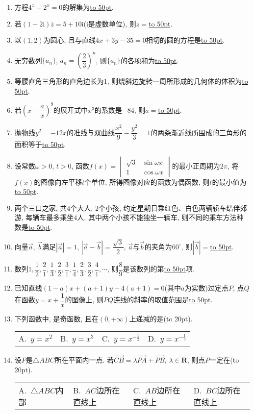 \documentclass[10pt,a4paper]{article}
\newcommand{\blank}[1]{\underline{\hbox to #1pt{}}}
\newcommand{\bracket}[1]{(\hbox to #1pt{})}
\newcommand{\fourch}[4]{\par\begin{tabular}{p{.23\textwidth}p{.23\textwidth}p{.23\textwidth}p{.23\textwidth}}
A.~#1 &B.~#2& C.~#3& D.~#4
\end{tabular}}
\begin{document}
\begin{enumerate}[1.]

\item 方程$4^x-2^x=0$的解集为\blank{50}.
\item 若$(1-2\mathrm{i})\overline z=5+10\mathrm{i}$($\mathrm{i}$是虚数单位), 则$z=$\blank{50}.
\item 以$(1,2)$为圆心, 且与直线$4x+3y-35=0$相切的圆的方程是\blank{50}.
\item 无穷数列$\{a_n\}$, $a_n=(\dfrac 23)^n$, 则$\{a_n\}$的各项和为\blank{50}.
\item 等腰直角三角形的直角边长为$1$, 则绕斜边旋转一周所形成的几何体的体积为\blank{50}.
\item 若$(x-\dfrac ax)^9$的展开式中$x^3$的系数是$-84$, 则$a=$\blank{50}.
\item 抛物线$y^2=-12x$的准线与双曲线$\dfrac{x^2}9-\dfrac{y^2}3=1$的两条渐近线所围成的三角形的面积等于\blank{50}.
\item 设常数$\omega >0$, $t>0$, 函数$f(x)=\begin{vmatrix}
\sqrt 3 & \sin \omega x  \\ 1 & \cos \omega x  \end{vmatrix}$的最小正周期为$2\pi$, 将$f(x)$的图像向左平移$t$个单位, 所得图像对应的函数为偶函数, 则$t$的最小值为\blank{50}.
\item 两个三口之家, 共$4$个大人, $2$个小孩, 约定星期日乘红色、白色两辆轿车结伴郊游, 每辆车最多乘坐$4$人, 其中两个小孩不能独坐一辆车, 则不同的乘车方法种数是\blank{50}.
\item 向量$\overrightarrow  a$, $\overrightarrow  b$满足$|\overrightarrow  a|=1$, $|\overrightarrow  a-\overrightarrow  b|=\dfrac{\sqrt 3}2$, $\overrightarrow  a$与$\overrightarrow  b$的夹角为$60^\circ$, 则$|\overrightarrow  b|=$\blank{50}.
\item 数列$1,\dfrac 12,\dfrac 21,\dfrac 13,\dfrac 22,\dfrac 31,\dfrac 14,\dfrac 23,\dfrac 32,\dfrac 41,\cdots$, 则$\dfrac 89$是该数列的第\blank{50}项.
\item 已知直线$(1-a)x+(a+1)y-4(a+1)=0$(其中$a$为实数)过定点$P$, 点$Q$在函数$y=x+\dfrac 1x$的图像上, 则$PQ$连线的斜率的取值范围是\blank{50}.
\item 下列函数中, 是奇函数, 且在$(0,+\infty)$上递减的是\bracket{20}.
\fourch{$y=x^2$}{$y=x^3$}{$y=x^{-\frac 12}$}{$y=x^{-\frac 13}$}
\item 设$P$是$\triangle ABC$所在平面内一点. 若$\overrightarrow{CB}=\lambda \overrightarrow{PA}+\overrightarrow{PB}$, $\lambda \in \mathbf{R}$, 则点$P$一定在\bracket{20}.
\fourch{$\triangle ABC$内部}{$AC$边所在直线上}{$AB$边所在直线上}{$BC$边所在直线上}

\end{enumerate}
\end{document}
